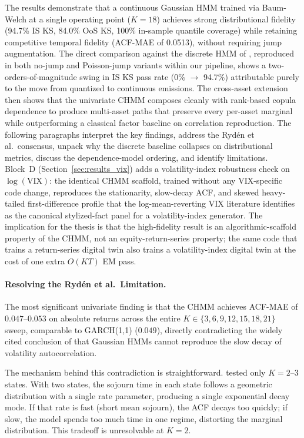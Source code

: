The results demonstrate that a continuous Gaussian HMM trained via Baum-Welch at a single operating point ($K = 18$) achieves strong distributional fidelity (94.7\% IS KS, 84.0\% OoS KS, 100\% in-sample quantile coverage) while retaining competitive temporal fidelity (ACF-MAE of 0.0513), without requiring jump augmentation.
The direct comparison against the discrete HMM of \citet{alswaidan2026hybrid}, reproduced in both no-jump and Poisson-jump variants within our pipeline, shows a two-orders-of-magnitude swing in IS KS pass rate (0\% $\to$ 94.7\%) attributable purely to the move from quantized to continuous emissions.
The cross-asset extension then shows that the univariate CHMM composes cleanly with rank-based copula dependence to produce multi-asset paths that preserve every per-asset marginal while outperforming a classical factor baseline on correlation reproduction.
The following paragraphs interpret the key findings, address the Ryd\'{e}n et al.\ consensus, unpack why the discrete baseline collapses on distributional metrics, discuss the dependence-model ordering, and identify limitations.
Block~D (Section~\ref{sec:results_vix}) adds a volatility-index robustness check on $\log(\text{VIX})$: the identical CHMM scaffold, trained without any VIX-specific code change, reproduces the stationarity, slow-decay ACF, and skewed heavy-tailed first-difference profile that the log-mean-reverting VIX literature \cite{papanicolaou2014regime, kaeck2013stochastic, dotsis2007empirical} identifies as the canonical stylized-fact panel for a volatility-index generator.
The implication for the thesis is that the high-fidelity result is an algorithmic-scaffold property of the CHMM, not an equity-return-series property; the same code that trains a return-series digital twin also trains a volatility-index digital twin at the cost of one extra $O(KT)$ EM pass.

\paragraph{Resolving the Ryd\'{e}n et al.\ Limitation.}
The most significant univariate finding is that the CHMM achieves ACF-MAE of $0.047$--$0.053$ on absolute returns across the entire $K \in \{3, 6, 9, 12, 15, 18, 21\}$ sweep, comparable to GARCH(1,1) ($0.049$), directly contradicting the widely cited conclusion of \citet{ryden1998stylized} that Gaussian HMMs cannot reproduce the slow decay of volatility autocorrelation.

The mechanism behind this contradiction is straightforward.
\citet{ryden1998stylized} tested only $K = 2$--$3$ states.
With two states, the sojourn time in each state follows a geometric distribution with a single rate parameter, producing a single exponential decay mode.
If that rate is fast (short mean sojourn), the ACF decays too quickly; if slow, the model spends too much time in one regime, distorting the marginal distribution.
This tradeoff is unresolvable at $K = 2$.


